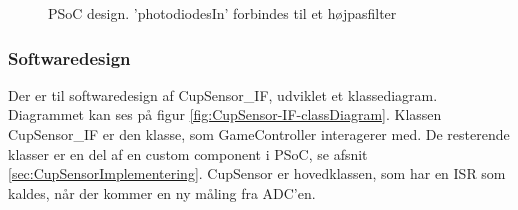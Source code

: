 \documentclass[Rapport/Rapport_main.tex]{subfiles}
\begin{document}
\begin{figure}[H]
    \centering
    \caption{PSoC design. 'photodiodesIn' forbindes til et højpasfilter}
    \label{fig:CupSensorPSoCDesign}
\end{figure}

\subsubsection{Softwaredesign}
Der er til softwaredesign af CupSensor\_IF, udviklet et klassediagram. Diagrammet kan ses på figur \ref{fig:CupSensor-IF-classDiagram}.  Klassen CupSensor\_IF er den klasse, som GameController interagerer med. De resterende klasser er en del af en custom component i PSoC, se afsnit \ref{sec:CupSensorImplementering}. CupSensor er hovedklassen, som har en ISR som kaldes, når der kommer en ny måling fra ADC'en. 
 
\end{document}
